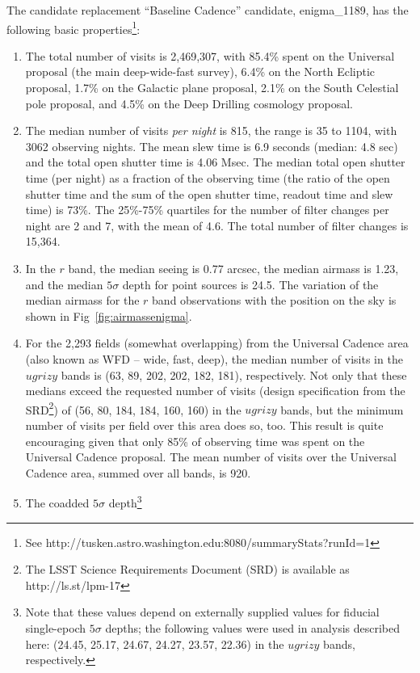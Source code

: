 \documentclass[manuscript]{article}
\begin{document}
The candidate replacement “Baseline Cadence” candidate, enigma\_1189, has the following
basic properties\footnote{See http://tusken.astro.washington.edu:8080/summaryStats?runId=1}:
\begin{enumerate}
\item The total number of visits is 2,469,307, with 85.4\% spent on the Universal proposal (the main 
deep-wide-fast survey), 6.4\% on the North Ecliptic proposal, 1.7\% on the Galactic plane proposal,
2.1\% on the South Celestial pole proposal, and 4.5\% on the Deep Drilling cosmology proposal. 
\item The median number of visits {\it per night} is 815, the range is 35 to 1104, with
3062 observing nights. The mean slew time is 6.9 seconds (median: 4.8 sec) and the total open shutter
time is 4.06 Msec. The median total open shutter time (per night) as a fraction of the observing time
(the ratio of the open shutter time and the sum of the open shutter time, readout time and
slew time) is 73\%. The 25\%-75\% quartiles for the number of filter changes per night
are 2 and 7, with the mean of 4.6. The total number of filter changes is 15,364.
\item In the $r$ band, the median seeing is 0.77 arcsec, the median airmass is 1.23,
and the median $5\sigma$ depth for point sources is 24.5. The variation of the median
airmass for the $r$ band observations with the position on the sky is shown in Fig~\ref{fig:airmassenigma}. 
\item For the 2,293 fields (somewhat overlapping) from the Universal Cadence area (also known as WFD -- wide, fast, deep), 
the median number of visits in the $ugrizy$ bands is (63, 89, 202, 202, 182, 181), respectively.
Not only that these medians exceed the requested number of visits (design specification from the 
SRD\footnote{The LSST Science Requirements Document (SRD) is available as http://ls.st/lpm-17}) 
of (56, 80, 184, 184, 160, 160) in the $ugrizy$ bands, but the minimum number of visits per 
field over this area does so, too. This result is quite encouraging given that only 85\% of observing
time was spent on the Universal Cadence proposal. The mean number of visits over the Universal Cadence area,
summed over all bands, is 920. 
\item The coadded $5\sigma$ depth\footnote{Note that these values depend on externally supplied values
for fiducial single-epoch $5\sigma$ depths; the following values were used in analysis described
here: (24.45, 25.17, 24.67, 24.27, 23.57, 22.36) in the $ugrizy$ bands, respectively. 
}
\end{enumerate}
\end{document}
